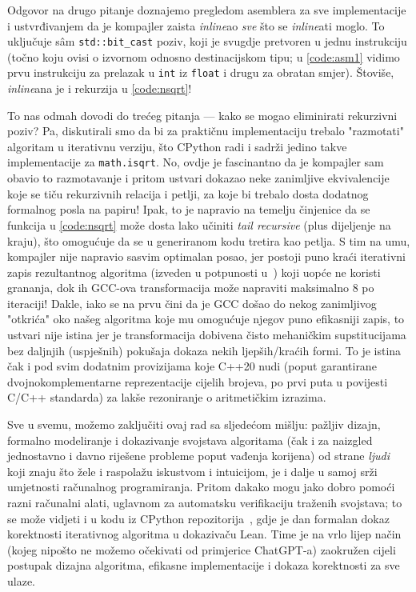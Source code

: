 \documentclass[12pt]{scrartcl}
\begin{document}
Odgovor na drugo pitanje doznajemo pregledom asemblera za sve implementacije i ustvrđivanjem da je kompajler zaista \textsl{inline}ao \emph{sve} što se
\textsl{inline}ati moglo. To uključuje s\^am \verb|std::bit_cast| poziv, koji je svugdje pretvoren u jednu instrukciju (točno koju ovisi o izvornom odnosno
destinacijskom tipu; u \autoref{code:asm1} vidimo prvu instrukciju za prelazak u \verb|int| iz \verb|float| i drugu za obratan smjer). Štoviše,
\textsl{inline}ana je i rekurzija u \autoref{code:nsqrt}!

To nas odmah dovodi do trećeg pitanja --- kako se mogao eliminirati rekurzivni poziv? Pa, diskutirali smo da bi za praktičnu implementaciju trebalo
"razmotati" algoritam u iterativnu verziju, što CPython radi i sadrži jedino takve implementacije za \verb|math.isqrt|. No, ovdje je fascinantno da je
kompajler sam obavio to razmotavanje i pritom ustvari dokazao neke zanimljive ekvivalencije koje se tiču rekurzivnih relacija i petlji, za koje bi
trebalo dosta dodatnog formalnog posla na papiru! Ipak, to je napravio na temelju
činjenice da se funkcija u \autoref{code:nsqrt} može dosta lako učiniti \textsl{tail recursive} (plus dijeljenje na kraju),
što omogućuje da se u generiranom kodu tretira kao petlja.
S tim na umu, kompajler nije napravio sasvim optimalan posao, jer postoji puno kraći iterativni zapis rezultantnog algoritma
(izveden u potpunosti u~\cite{mdickpaper}) koji uopće ne koristi grananja,
dok ih GCC-ova transformacija može napraviti maksimalno $8$ po iteraciji! Dakle, iako se na prvu čini da je GCC došao
do nekog zanimljivog "otkrića" oko našeg
algoritma koje mu omogućuje njegov puno efikasniji zapis, to ustvari nije istina jer je transformacija dobivena čisto mehaničkim supstitucijama bez daljnjih
(uspješnih) pokušaja dokaza nekih ljepših/kraćih formi. To je istina čak i pod svim dodatnim provizijama koje C++20 nudi (poput garantirane dvojnokomplementarne
reprezentacije cijelih brojeva, po prvi puta u povijesti C/C++ standarda) za lakše rezoniranje o aritmetičkim izrazima.

Sve u svemu, možemo zaključiti ovaj rad sa sljedećom mišlju: pažljiv dizajn, formalno modeliranje i dokazivanje svojstava algoritama
(čak i za naizgled jednostavno i davno riješene probleme poput vađenja korijena)
od strane \emph{ljudi} koji znaju što žele i raspolažu iskustvom i intuicijom, je i dalje u samoj srži umjetnosti računalnog programiranja. Pritom
dakako mogu jako dobro pomoći razni računalni alati, uglavnom za automatsku verifikaciju traženih svojstava; to se
može vidjeti i u kodu iz CPython repozitorija~\cite{Cpythonisqrt}, gdje je dan formalan dokaz korektnosti iterativnog algoritma u dokazivaču Lean.
Time je na vrlo lijep način (kojeg nipošto ne možemo očekivati od primjerice ChatGPT-a)
zaokružen cijeli postupak dizajna algoritma, efikasne implementacije i dokaza korektnosti za sve ulaze.
\pagebreak


\printbibliography
\end{document}
